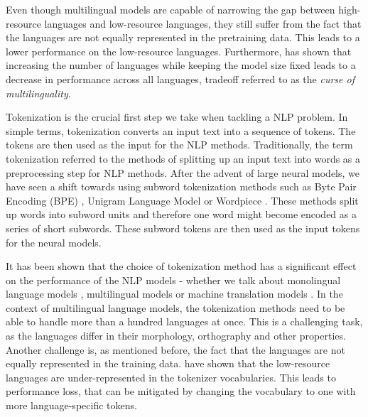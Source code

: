 Even though multilingual models are capable of narrowing the gap between high-resource languages and low-resource languages, they still suffer from the fact that the languages are not equally represented in the pretraining data. This leads to a lower performance on the low-resource languages. \cite{conneau_unsupervised_2020} Furthermore,  has shown that increasing the number of languages while keeping the model size fixed leads to a decrease in performance across all languages, tradeoff referred to as the \textit{curse of multilinguality}. \cite{conneau_unsupervised_2020} 

Tokenization is the crucial first step we take when tackling a NLP problem. In simple terms, tokenization converts an input text into a sequence of tokens. The tokens are then used as the input for the NLP methods. Traditionally, the term tokenization referred to the methods of splitting up an input text into words as a preprocessing step for NLP methods. After the advent of large neural models, we have seen a shift towards using subword tokenization methods such as Byte Pair Encoding (BPE) \cite{sennrich_neural_2016}, Unigram Language Model \cite{kudo_sentencepiece_2018} or Wordpiece \cite{devlin_bert_2019}. These methods split up words into subword units and therefore one word might become encoded as a series of short subwords. These subword tokens are then used as the input tokens for the neural models.  

It has been shown that the choice of tokenization method has a significant effect on the performance of the NLP models - whether we talk about monolingual language models \cite{bostrom_byte_2020}, multilingual models \cite{rust_how_2021} or machine translation models \cite{kudo_sentencepiece_2018,gowda_finding_2020}. In the context of multilingual language models, the tokenization methods need to be able to  handle more than a hundred languages at once. This is a challenging task, as the languages differ in their morphology, orthography and other properties.  Another challenge is, as mentioned before, the fact that the languages are not equally represented in the training data.  have shown that the low-resource languages are under-represented in the tokenizer vocabularies. This leads to performance loss, that can be mitigated by changing the vocabulary to one with more language-specific tokens. \cite{rust_how_2021}

